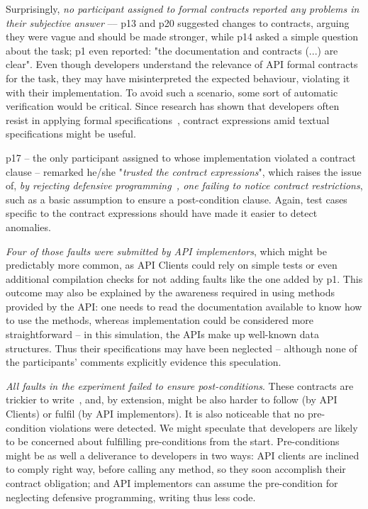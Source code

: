Surprisingly, \emph{no participant assigned to formal contracts reported any problems in their subjective answer} –– p13 and p20 suggested changes to contracts, arguing they were vague and should be made stronger, while p14 asked a simple question about the task; p1 even reported: "the documentation and contracts (...) are clear".
Even though developers understand the relevance of API formal contracts for the task, they may have misinterpreted the expected behaviour, violating it with their implementation.
To avoid such a scenario, some sort of automatic verification would be critical.
Since research has shown that developers often resist in applying formal specifications~\cite{Polikarpova-etal09,Estler-etal14}, contract expressions amid textual specifications might be useful.

p17 -- the only participant assigned to \contractjdoc{} whose implementation violated a contract clause -- remarked he/she "\emph{trusted the contract expressions}", 
which raises the issue of, \emph{by rejecting defensive programming~\cite{dbc}, one failing to notice contract restrictions}, such as a basic assumption to ensure a post-condition clause.
Again, test cases specific to the contract expressions should have made it easier to detect anomalies.

\emph{Four of those faults were submitted by API implementors}, which might be predictably more common, as API Clients could rely on simple tests or even additional compilation checks for not adding faults like the one added by p1.
This outcome may also be explained by the awareness required in using methods provided by the API: one needs to read the documentation available to know how to use the methods, whereas implementation could be considered more straightforward -- in this simulation, 
the APIs make up well-known data structures. Thus their specifications may have been neglected -- although none of the participants' comments explicitly evidence this speculation.

\emph{All faults in the experiment failed to ensure post-conditions}. 
These contracts are trickier to write~\cite{Rosenblum}, and, by extension, might be also harder to follow (by API Clients) or fulfil (by API implementors). 
It is also noticeable that no pre-condition violations were detected. We might speculate that developers are likely to be concerned about fulfilling pre-conditions from the start. Pre-conditions might be as well a deliverance to developers in two ways: API clients are inclined to comply right way, before calling any method, so they soon accomplish their contract obligation; and API implementors can assume the pre-condition for neglecting defensive programming, writing thus less code.

